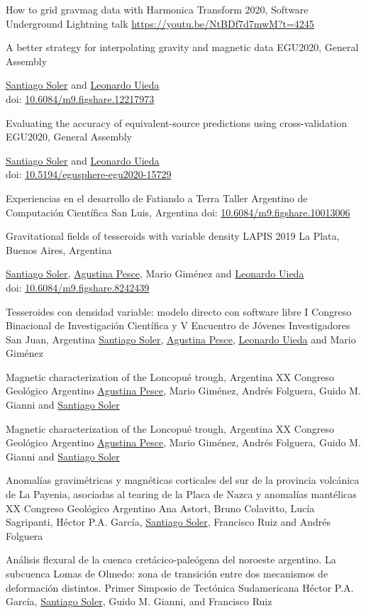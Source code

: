 \documentclass[a4paper,12pt,sans,colorlinks]{moderncv/moderncv}
\newcommand{\me}{\href{https://www.santisoler.com}{Santiago Soler}}
\newcommand{\agustina}{\href{https://aguspesce.github.io}{Agustina Pesce}}
\newcommand{\guido}{Guido M. Gianni}
\newcommand{\leo}{\href{https://www.leouieda.com}{Leonardo Uieda}}
\newcommand{\mario}{Mario Giménez}
\newcommand{\folguera}{Andrés Folguera}
\newcommand{\pichu}{Héctor P.A. García}
\newcommand{\paco}{Francisco Ruiz}
\newcommand{\doi}[1]{%
    \href{https://doi.org/#1}{#1}
}
\begin{document}
{How to grid gravmag data with Harmonica}
{Transform 2020, Software Underground}
{}
{Lightning talk}
{\url{https://youtu.be/NtBDf7d7mwM?t=4245}}

{A better strategy for interpolating gravity and magnetic data}
{EGU2020, General Assembly}
{}
{}
{
    \me{} and \leo{}
    \\
    doi: \doi{10.6084/m9.figshare.12217973}
}

{
    Evaluating the accuracy of equivalent-source predictions using
    cross-validation
}
{EGU2020, General Assembly}
{}
{}
{
    \me{} and \leo{}
    \\
    doi: \doi{10.5194/egusphere-egu2020-15729}
}

{Experiencias en el desarrollo de Fatiando a Terra}
{Taller Argentino de Computación Científica}
{San Luis, Argentina}
{}
{doi: \doi{10.6084/m9.figshare.10013006}}

{Gravitational fields of tesseroids with variable density}
{LAPIS 2019}
{La Plata, Buenos Aires, Argentina}
{}
{
    \me{}, \agustina{}, \mario{} and \leo{}
    \\
    doi: \doi{10.6084/m9.figshare.8242439}
}

{Tesseroides con densidad variable: modelo directo con software libre}
{
    I Congreso Binacional de Investigación Científica y V Encuentro de Jóvenes
    Investigadores
}
{San Juan, Argentina}
{}
{\me{}, \agustina{}, \leo{} and \mario{}}

{Magnetic characterization of the Loncopué trough, Argentina}
{XX Congreso Geológico Argentino}
{}
{}
{\agustina{}, \mario{}, \folguera{}, \guido{} and \me{}}

{Magnetic characterization of the Loncopué trough, Argentina}
{XX Congreso Geológico Argentino}
{}
{}
{\agustina{}, \mario{}, \folguera{}, \guido{} and \me{}}

{
    Anomalías gravimétricas y magnéticas corticales del sur de la provincia
    volcánica de La Payenia, asociadas al tearing de la Placa de Nazca
    y anomalías mantélicas
}
{XX Congreso Geológico Argentino}
{}
{}
{
    Ana Astort, Bruno Colavitto, Lucía Sagripanti, \pichu{}, \me{}, \paco{}
    and \folguera{}
}

{
   Análisis flexural de la cuenca cretácico-paleógena del noroeste
   argentino. La subcuenca Lomas de Olmedo: zona de transición entre dos
   mecanismos de deformación distintos.
}
{Primer Simposio de Tectónica Sudamericana}
{}
{}
{\pichu{}, \me{}, \guido{}, and \paco{}}
\end{document}

